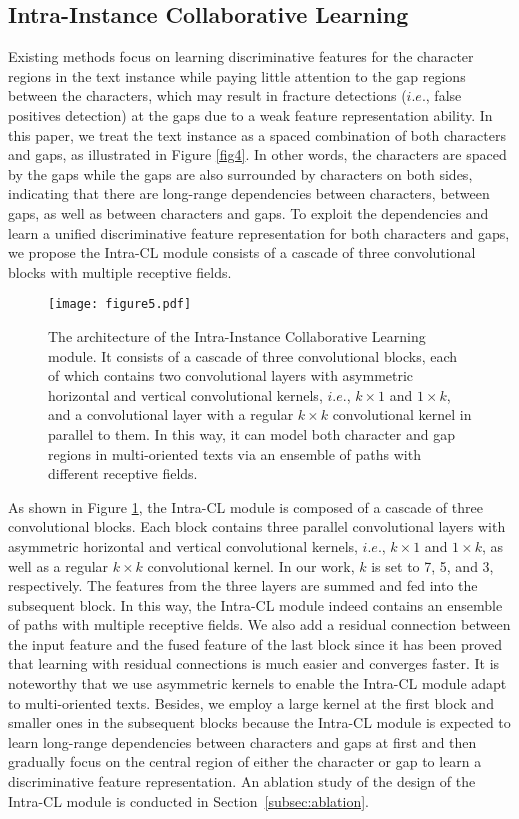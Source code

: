 \subsection{Intra-Instance Collaborative Learning}
\label{subsec:intraCL}
Existing methods focus on learning discriminative features for the character regions in the text instance while paying little attention to the gap regions between the characters, which may result in fracture detections ($i.e.$, false positives detection) at the gaps due to a weak feature representation ability. In this paper, we treat the text instance as a spaced combination of both characters and gaps, as illustrated in Figure \ref{fig4}. In other words, the characters are spaced by the gaps while the gaps are also surrounded by characters on both sides, indicating that there are long-range dependencies between characters, between gaps, as well as between characters and gaps. To exploit the dependencies and learn a unified discriminative feature representation for both characters and gaps, we propose the Intra-CL module consists of a cascade of three convolutional blocks with multiple receptive fields.


\begin{figure}[t]
  \centering
  \texttt{[image: figure5.pdf]}
  \caption{The architecture of the Intra-Instance Collaborative Learning module. It consists of a cascade of three convolutional blocks, each of which contains two convolutional layers with asymmetric horizontal and vertical convolutional kernels, $i.e.$,  $k\times1$ and $1\times k$, and a convolutional layer with a regular $k\times k$ convolutional kernel in parallel to them. In this way, it can model both character and gap regions in multi-oriented texts via an ensemble of paths with different receptive fields.}
  \label{fig5}
\end{figure}


As shown in Figure \ref{fig5}, the Intra-CL module is composed of a cascade of three convolutional blocks. Each block contains three parallel convolutional layers with asymmetric horizontal and vertical convolutional kernels, $i.e.$,  $k\times1$ and $1\times k$, as well as a regular $k\times k$ convolutional kernel. In our work, $k$ is set to 7, 5, and 3, respectively. The features from the three layers are summed and fed into the subsequent block. In this way, the Intra-CL module indeed contains an ensemble of paths with multiple receptive fields. We also add a residual connection between the input feature and the fused feature of the last block since it has been proved that learning with residual connections is much easier and converges faster. It is noteworthy that we use asymmetric kernels to enable the Intra-CL module adapt to multi-oriented texts. Besides, we employ a large kernel at the first block and smaller ones in the subsequent blocks because the Intra-CL module is expected to learn long-range dependencies between characters and gaps at first and then gradually focus on the central region of either the character or gap to learn a discriminative feature representation. An ablation study of the design of the Intra-CL module is conducted in Section~\ref{subsec:ablation}.

